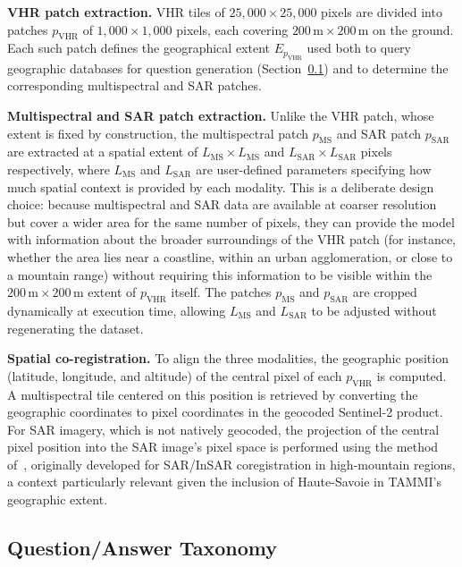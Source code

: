 \textbf{VHR patch extraction.} VHR tiles of
$25{,}000 \times 25{,}000$ pixels are divided into patches
$p_\text{VHR}$ of $1{,}000 \times 1{,}000$ pixels, each
covering $200\,\text{m} \times 200\,\text{m}$ on the ground.
Each such patch defines the geographical extent
$E_{p_\text{VHR}}$ used both to query geographic databases
for question generation (Section~\ref{sec:chap5_dataset_qa})
and to determine the corresponding multispectral and SAR
patches.

\textbf{Multispectral and SAR patch extraction.} Unlike the
VHR patch, whose extent is fixed by construction, the
multispectral patch $p_\text{MS}$ and SAR patch $p_\text{SAR}$
are extracted at a spatial extent of $L_\text{MS} \times
L_\text{MS}$ and $L_\text{SAR} \times L_\text{SAR}$ pixels
respectively, where $L_\text{MS}$ and $L_\text{SAR}$ are
user-defined parameters specifying how much spatial context
is provided by each modality. This is a deliberate design
choice: because multispectral and SAR data are available at
coarser resolution but cover a wider area for the same number
of pixels, they can provide the model with information about
the broader surroundings of the VHR patch (for instance,
whether the area lies near a coastline, within an urban
agglomeration, or close to a mountain range) without
requiring this information to be visible within the
$200\,\text{m} \times 200\,\text{m}$ extent of
$p_\text{VHR}$ itself. The patches $p_\text{MS}$ and
$p_\text{SAR}$ are cropped dynamically at execution time,
allowing $L_\text{MS}$ and $L_\text{SAR}$ to be adjusted
without regenerating the dataset.

\textbf{Spatial co-registration.} To align the three
modalities, the geographic position (latitude, longitude,
and altitude) of the central pixel of each $p_\text{VHR}$ is
computed. A multispectral tile centered on this position is
retrieved by converting the geographic coordinates to pixel
coordinates in the geocoded Sentinel-2 product. For SAR
imagery, which is not natively geocoded, the projection of
the central pixel position into the SAR image's pixel space
is performed using the method
of~\cite{weissgerber2022labsar}, originally developed for
SAR/InSAR coregistration in high-mountain regions, a
context particularly relevant given the inclusion of
Haute-Savoie in TAMMI's geographic extent.

\subsection{Question/Answer Taxonomy}
\label{sec:chap5_dataset_qa}

